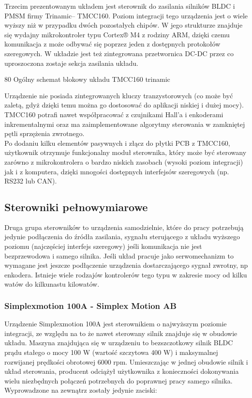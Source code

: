 Trzecim prezentowanym układem jest sterownik do zasilania silników BLDC i PMSM firmy Trinamic-- TMCC160. Poziom integracji tego urządzenia jest o wiele wyższy niż w przypadku dwóch pozostałych chipów. W jego strukturze znajduje się wydajny mikrokontroler typu Cortex® M4 z rodziny ARM, dzięki czemu komunikacja z może odbywać się poprzez jeden z dostępnych protokołów szeregowych. W układzie jest też zintegrowana przetwornica DC-DC przez co uproszoczona zostaje sekcja zasilania układu. 

	{80}
	{Ogólny schemat blokowy układu TMCC160}
	{trinamic}

Urządzenie nie posiada zintegrowanych kluczy tranzystorowych (co może być zaletą, gdyż dzięki temu można go dostosować do aplikacji niskiej i dużej mocy). TMCC160 potrafi nawet współpracować z czujnikami Hall'a i enkoderami inkrementalnymi oraz ma zaimplementowane algorytmy sterowania w zamkniętej pętli sprzężenia zwrotnego. \\

Po dodaniu kilku elementów pasywnych i złącz do płytki PCB z TMCC160, użytkownik otrzymuje funkcjonalny moduł sterownika, który może być sterowany zarówno z mikrokontrolera o bardzo niskich zasobach (wysoki poziom integracji) jak i z komputera, dzięki mnogości dostępnych interfejsów szeregowych (np. RS232 lub CAN).

\subsection{Sterowniki pełnowymiarowe}

Druga grupa sterowników to urządzenia samodzielnie, które do pracy potrzebują jedynie podłączenia do źródła zasilania, sygnału sterującego z układu wyższego poziomu (najczęściej interfejs szeregowy) jeśli komunikacja nie jest bezprzewodowa i samego silnika. Jeśli układ pracuje jako serwomechanizm to wymagane jest jeszcze podłączenie urządzenia dostarczającego sygnał zwrotny, np enkodera. Istnieje wiele rodzajów kontrolerów tego typu w zakresie mocy od kilku watów do kilkunastu kilowatów. 

\subsubsection{Simplexmotion 100A - Simplex Motion AB}
\label{sss:simplex}

Urządzenie Simplexmotion 100A jest sterownikiem o najwyższym poziomie integracji, ze względu na to że nawet sterowany silnik znajduje się w obudowie układu. Maszyna znajdująca się w urządzeniu to bezszczotkowy silnik BLDC prądu stałego o mocy 100 W (wartość szczytowa 400 W) i maksymalnej rozwijanej prędkości obrotowej 6000 rpm. Umieszczając w jednej obudowie silnik i układ sterowania, producent odciążył użytkownika z konieczności dokonywania wielu niezbędnych połączeń potrzebnych do poprawnej pracy samego silnika. Wyprowadzone na zewnątrz zostały jedynie zaciski:

